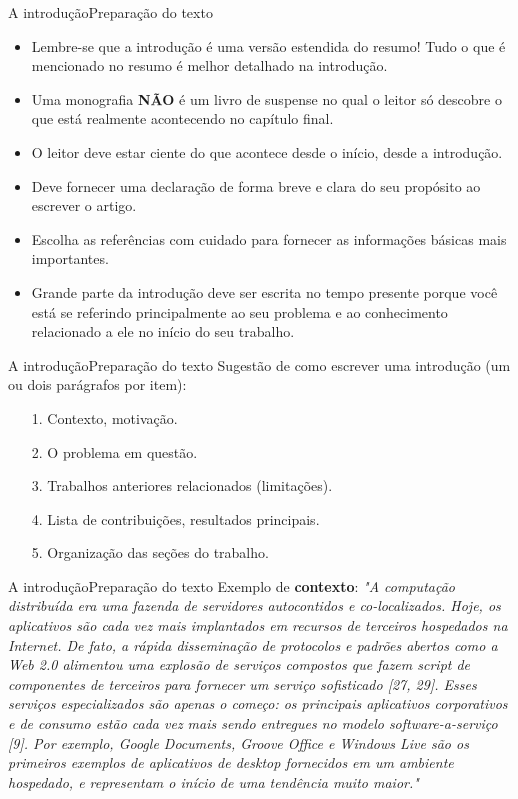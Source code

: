 \documentclass[t]{beamer}
\begin{document}

\begin{ftst}{A introdução}{Preparação do texto}
\justifying
\small
\begin{itemize}
    \item Lembre-se que a introdução é uma versão estendida do resumo! Tudo o que é mencionado no resumo é
    melhor detalhado na introdução.
    \item Uma monografia \textbf{NÃO} é um livro de suspense no qual o leitor só descobre o que está realmente acontecendo no capítulo final. 
    \item O leitor deve estar ciente do que acontece desde o início, desde a introdução.
    \item Deve fornecer uma declaração de forma breve e clara do seu propósito ao escrever o artigo.
    \item Escolha as referências com cuidado para fornecer as informações básicas mais importantes.
    \item Grande parte da introdução deve ser escrita no tempo presente porque você está se referindo principalmente ao seu problema e ao conhecimento relacionado a ele no início do seu trabalho.
    
\end{itemize}
\end{ftst}


\begin{ftst}{A introdução}{Preparação do texto}
\justifying
Sugestão de como escrever uma introdução (um ou dois parágrafos por item):
\small
\vone
\begin{itemize}
    \item[1.] Contexto, motivação.
    \item[2.] O problema em questão.
    \item[3.] Trabalhos anteriores relacionados (limitações).
    \item[4.] Lista de contribuições, resultados principais.
    \item[5.] Organização das seções do trabalho.
\end{itemize}
\end{ftst}


\begin{ftst}{A introdução}{Preparação do texto}
\justifying
Exemplo de \textbf{contexto}:
\small
\vone
\textit{"A computação distribuída era uma fazenda de servidores autocontidos e co-localizados. Hoje, os aplicativos são cada vez mais implantados em recursos de terceiros hospedados na Internet. De fato, a rápida disseminação de protocolos e padrões abertos como a Web 2.0 alimentou uma explosão de serviços compostos que fazem script de componentes de terceiros para fornecer um serviço sofisticado [27, 29]. Esses serviços especializados são apenas o começo: os principais aplicativos corporativos e de consumo estão cada vez mais sendo entregues no modelo software-a-serviço [9]. Por exemplo, Google Documents, Groove Office e Windows Live são os primeiros exemplos de aplicativos de desktop fornecidos em um ambiente hospedado, e representam o início de uma tendência muito maior."}
\end{ftst}
\end{document}
